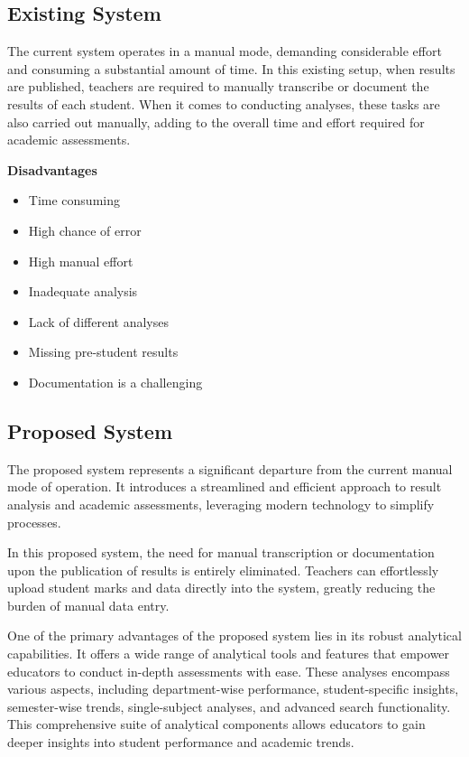 \documentclass{nascproject}
\begin{document}
\subsection{Existing System}
The current system operates in a manual mode, demanding considerable effort and consuming a substantial amount of time. In this existing setup, when results are published, teachers are required to manually transcribe or document the results of each student. When it comes to conducting analyses, these tasks are also carried out manually, adding to the overall time and effort required for academic assessments.

\textbf{Disadvantages}
\begin{itemize}
	\item Time consuming
	\item High chance of error
	\item High manual effort
	\item Inadequate analysis
	\item Lack of different analyses
	\item Missing pre-student results
	\item Documentation is a challenging
\end{itemize}
\subsection{Proposed System}
The proposed system represents a significant departure from the current manual mode of operation. It introduces a streamlined and efficient approach to result analysis and academic assessments, leveraging modern technology to simplify processes.

In this proposed system, the need for manual transcription or documentation upon the publication of results is entirely eliminated. Teachers can effortlessly upload student marks and data directly into the system, greatly reducing the burden of manual data entry.

One of the primary advantages of the proposed system lies in its robust analytical capabilities. It offers a wide range of analytical tools and features that empower educators to conduct in-depth assessments with ease. These analyses encompass various aspects, including department-wise performance, student-specific insights, semester-wise trends, single-subject analyses, and advanced search functionality. This comprehensive suite of analytical components allows educators to gain deeper insights into student performance and academic trends.
\end{document}
